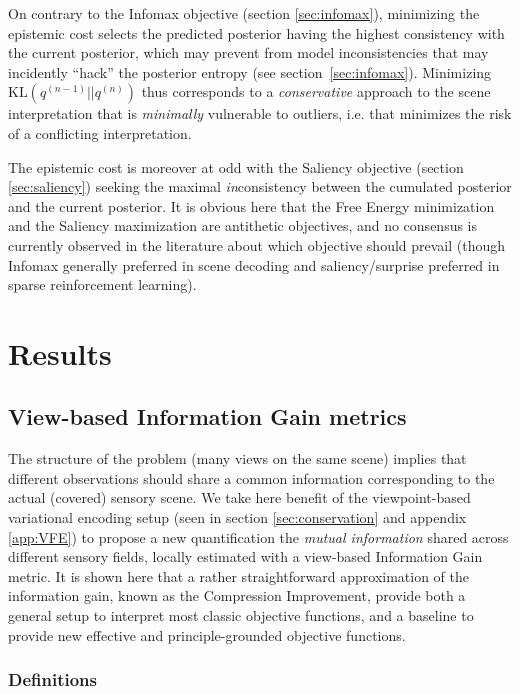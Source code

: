 \documentclass[12pt,twoside,openright]{article}
\begin{document}
On contrary to the Infomax objective (section \ref{sec:infomax}), minimizing the  epistemic cost selects the predicted posterior having the highest consistency with the current posterior, which may prevent from model inconsistencies that may incidently ``hack'' the posterior entropy (see section~\ref{sec:infomax}).
Minimizing $\text{KL}(q^{(n-1)}||q^{(n)})$ thus corresponds to a \emph{conservative} approach to the scene interpretation
that is \emph{minimally} vulnerable to outliers, i.e. that minimizes the risk of a conflicting interpretation. 

The  epistemic cost is moreover at odd with the Saliency objective (section \ref{sec:saliency}) seeking the maximal \emph{in}consistency between the cumulated posterior and the current posterior.
It is obvious here that the Free Energy minimization and the Saliency maximization are antithetic objectives, and no consensus is currently observed in the literature about which objective should prevail (though Infomax generally preferred in scene decoding and saliency/surprise preferred in sparse reinforcement learning).


\section{Results} \label{sec:results}



\subsection{View-based Information Gain metrics}\label{sec:info-gain}
The structure of the problem (many views on the same scene) implies that different observations should share a common information corresponding to the actual (covered) sensory scene.
We take here benefit of the viewpoint-based variational encoding setup
(seen in section \ref{sec:conservation} and appendix \ref{app:VFE}) to propose a new quantification the \emph{mutual information} shared across different sensory fields, locally estimated with a view-based Information Gain metric. It is shown here that a rather straightforward approximation of the information gain,
known as the Compression Improvement, provide both a general setup to interpret most classic objective functions, and a baseline to provide new effective and  principle-grounded objective functions.

\subsubsection{Definitions}
\end{document}
